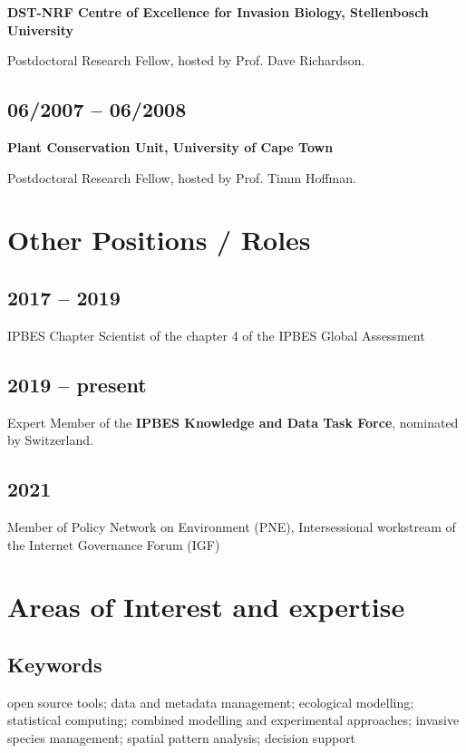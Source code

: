 \documentclass[a4paper]{article}
\begin{document}
\textbf{DST-NRF Centre of Excellence for Invasion Biology, Stellenbosch University}

Postdoctoral Research Fellow, hosted by Prof. Dave Richardson.

\subsection{06/2007 -- 06/2008}

\textbf{Plant Conservation Unit, University of Cape Town} 

Postdoctoral Research Fellow, hosted by Prof. Timm Hoffman.

\section{Other Positions / Roles}

\subsection{2017 -- 2019}

IPBES Chapter Scientist of the chapter 4 of the IPBES Global Assessment

\subsection{2019 -- present}

Expert Member of the \textbf{IPBES Knowledge and Data Task Force}, nominated by Switzerland. 

\subsection{2021}

Member of Policy Network on Environment (PNE), Intersessional workstream of
	the Internet Governance Forum (IGF)

\section{Areas of Interest and expertise}

\subsection{Keywords}

open source tools; data and metadata management; ecological modelling;
	statistical computing; combined modelling and experimental approaches;
	invasive species management; spatial pattern analysis; decision support
\end{document}
